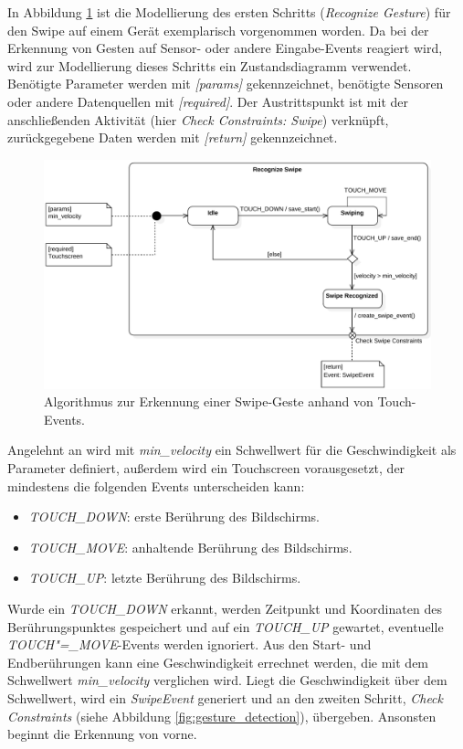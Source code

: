 In Abbildung \ref{fig:swipe_recognition} ist die Modellierung des ersten Schritts (\textit{Recognize Gesture}) für den Swipe auf einem Gerät exemplarisch vorgenommen worden. Da bei der Erkennung von Gesten auf Sensor- oder andere Eingabe-Events reagiert wird, wird zur Modellierung dieses Schritts ein Zustandsdiagramm verwendet. Benötigte Parameter werden mit \textit{{[}params{]}} gekennzeichnet, benötigte Sensoren oder andere Datenquellen mit \textit{{[}required{]}}. Der Austrittspunkt ist mit der anschließenden Aktivität (hier \textit{Check Constraints: Swipe}) verknüpft, zurückgegebene Daten werden mit \textit{{[}return{]}} gekennzeichnet.
\begin{figure}[h]
\centering
\includegraphics[width=1\textwidth]{bilder/recognize_swipe.pdf}
\caption{Algorithmus zur Erkennung einer Swipe-Geste anhand von Touch-Events.}
\label{fig:swipe_recognition}
\end{figure}

Angelehnt an \citep{Hinckley2004} wird mit \textit{min\_velocity} ein Schwellwert für die Geschwindigkeit als Parameter definiert, außerdem wird ein Touchscreen vorausgesetzt, der mindestens die folgenden Events unterscheiden kann:
\begin{itemize}
\item \textit{TOUCH\_DOWN}: erste Berührung des Bildschirms.
\item \textit{TOUCH\_MOVE}: anhaltende Berührung des Bildschirms.
\item \textit{TOUCH\_UP}: letzte Berührung des Bildschirms.
\end{itemize}

Wurde ein \textit{TOUCH\_DOWN} erkannt, werden Zeitpunkt und Koordinaten des Berührungspunktes gespeichert und auf ein \textit{TOUCH\_UP} gewartet, eventuelle \textit{TOUCH"=\_MOVE}-Events werden ignoriert. Aus den Start- und Endberührungen kann eine Geschwindigkeit errechnet werden, die mit dem Schwellwert \textit{min\_velocity} verglichen wird. Liegt die Geschwindigkeit über dem Schwellwert, wird ein \textit{SwipeEvent} generiert und an den zweiten Schritt, \textit{Check Constraints} (siehe Abbildung \ref{fig:gesture_detection}), übergeben. Ansonsten beginnt die Erkennung von vorne.


